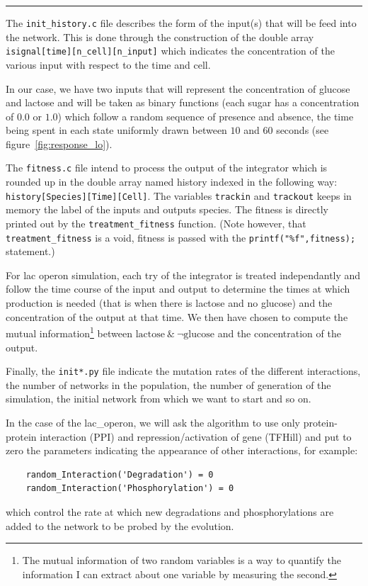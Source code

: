 \documentclass[]{article}
\newcommand{\sepline}{\begin{center}\rule{0.5\linewidth}{\linethickness}\end{center}}
\begin{document}
\sepline{}

The \verb#init_history.c# file describes the form of the input(s) that
will be feed into the network. This is done through the construction of
the double array \verb#isignal[time][n_cell][n_input]# which indicates 
the concentration of the various input with respect to the time and cell.

In our case, we have two inputs that will
represent the concentration of glucose and lactose and will be taken as
binary functions (each sugar has a concentration of $0.0$ or $1.0$) which follow
a random sequence of presence and absence, the time being spent in each state 
uniformly drawn between \(10\) and \(60\) seconds (see figure~\ref{fig:response_lo}).

\vspace{1em}

The \verb#fitness.c# file intend to process the output of the
integrator which is rounded up in the double array named history indexed in the
following way: \verb#history[Species][Time][Cell]#. The variables
\verb#trackin# and \verb#trackout# keeps in memory the label of the inputs and
outputs species. The fitness is directly printed out by the \verb#treatment_fitness#
function. (Note however, that \verb#treatment_fitness# is a void,
fitness is passed with the \verb#printf("%f",fitness);# statement.)

For lac operon simulation, each try of the integrator is treated
independantly and follow the time course of the input and output to
determine the times at which production is needed (that is when there is
lactose and no glucose) and the concentration of the output at that
time. We then have chosen to compute the mutual information\footnote{
The mutual information of two random variables is a way to quantify the
information I can extract about one variable by measuring the second.}
between $\text{lactose}~\&~\neg \text{glucose}$ and the concentration
of the output.

\vspace{1em}

Finally, the \verb#init*.py# file indicate the mutation rates of the
different interactions, the number of networks in the population, the
number of generation of the simulation, the initial
network from which we want to start and so on.

In the case of the
lac\_operon, we will ask the algorithm to use only protein-protein
interaction (PPI) and repression/activation of gene (TFHill) and put
to zero the parameters indicating the appearance of other interactions,
for example:
\begin{verbatim}
    random_Interaction('Degradation') = 0
    random_Interaction('Phosphorylation') = 0
\end{verbatim}
which control the rate at which
new degradations and phosphorylations are added to the network to be
probed by the evolution.
\end{document}

